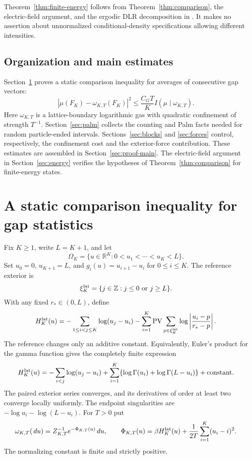 \documentclass[11pt,reqno]{amsart}
\numberwithin{equation}{section}
\theoremstyle{definition}
\theoremstyle{remark}
\newcommand{\R}{\mathbb R}
\newcommand{\Z}{\mathbb Z}
\newcommand{\1}{\mathbf 1}
\newcommand{\PV}{\operatorname{PV}}
\newcommand{\dd}{\,d}
\newcommand{\abs}[1]{\left\lvert #1\right\rvert}
\begin{document}
Theorem~\ref{thm:finite-energy} follows from
Theorem~\ref{thm:comparison}, the electric-field argument, and the ergodic
DLR decomposition in \cite[Proposition~3.13]{DHLM}. It makes no assertion
about unnormalized conditional-density specifications allowing different
intensities.

\subsection{Organization and main estimates}

Section~\ref{sec:entropy} proves a static comparison inequality for
averages of consecutive gap vectors:
\[
|\mu(F_K)-\omega_{K,T}(F_K)|^2
\le \frac{C_GT}{K}I(\mu\mid\omega_{K,T}).
\]
Here $\omega_{K,T}$ is a lattice-boundary logarithmic gas with quadratic
confinement of strength $T^{-1}$. Section~\ref{sec:palm} collects the
counting and Palm facts needed for random particle-ended intervals.
Sections~\ref{sec:blocks} and \ref{sec:forces} control, respectively, the
confinement cost and the exterior-force contribution. These estimates
are assembled in Section~\ref{sec:proof-main}. The electric-field
argument in Section~\ref{sec:energy} verifies the hypotheses of
Theorem~\ref{thm:comparison} for finite-energy states.

\section{A static comparison inequality for gap statistics}
\label{sec:entropy}

Fix $K\ge1$, write $L=K+1$, and let
\[
\Omega_K=\{u\in\R^K:0<u_1<\cdots<u_K<L\}.
\]
Set $u_0=0$, $u_{K+1}=L$, and $g_i(u)=u_{i+1}-u_i$ for
$0\le i\le K$. The reference exterior is
\[
\xi_K^{\rm lat}=\{j\in\Z:j\le0\text{ or }j\ge L\}.
\]
With any fixed $r_*\in(0,L)$, define
\begin{equation}\label{eq:lattice-energy}
H_K^{\rm lat}(u)=
-\sum_{1\le i<j\le K}\log(u_j-u_i)
-\sum_{i=1}^K\PV\sum_{p\in\xi_K^{\rm lat}}
       \log\abs{\frac{u_i-p}{r_*-p}}.
\end{equation}
The reference changes only an additive constant. Equivalently, Euler's
product for the gamma function gives the completely finite expression
\[
H_K^{\rm lat}(u)=
-\sum_{i<j}\log(u_j-u_i)
+\sum_{i=1}^K\{\log\Gamma(u_i)+\log\Gamma(L-u_i)\}
+\text{constant}.
\]
The paired exterior series converges, and its derivatives of order at
least two converge locally uniformly. The endpoint singularities are
$-\log u_i-\log(L-u_i)$.
For $T>0$ put
\begin{equation}\label{eq:reference}
\omega_{K,T}(\dd u)=Z_{K,T}^{-1}e^{-\Phi_{K,T}(u)}\dd u,\qquad
\Phi_{K,T}(u)=\beta H_K^{\rm lat}(u)
                  +\frac1{2T}\sum_{i=1}^K(u_i-i)^2.
\end{equation}
The normalizing constant is finite and strictly positive.
\end{document}
